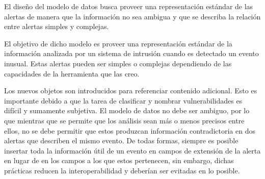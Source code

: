 El diseño del modelo de datos busca proveer una representación estándar de las 
alertas de manera que la información no sea ambigua y que se describa la 
relación entre alertas simples y complejas.

El objetivo de dicho modelo es proveer una representación estándar de la 
información analizada por un sistema de intrusión cuando es detectado 
un evento inusual. Estas alertas pueden ser simples o complejas 
dependiendo de las capacidades de la herramienta que las creo.

Los nuevos objetos son introducidos para referenciar contenido adicional. Esto 
es importante debido a que la tarea de clasificar y nombrar vulnerabilidades es 
difícil y sumamente subjetiva. El modelo de datos no debe ser ambiguo, por lo 
que mientras que se permite que los análisis sean más o menos precisos 
entre ellos, no se debe permitir que estos produzcan información contradictoria  
en dos alertas que describen el mismo evento. De todas formas, siempre es 
posible insertar toda la información útil de un evento en campos de extensión 
de la alerta en lugar de en los campos a los que estos pertenecen, sin embargo, 
dichas prácticas reducen la interoperabilidad y deberían ser evitadas en lo 
posible.



